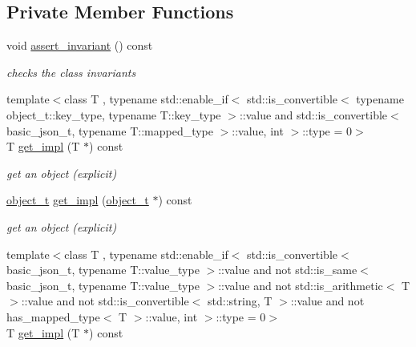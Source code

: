 \subsection*{Private Member Functions}
\begin{DoxyCompactItemize}
\item 
void \hyperlink{classnlohmann_1_1basic__json_a68ffa02e8ac1a14615bc767da40bc1c9}{assert\+\_\+invariant} () const 
\begin{DoxyCompactList}\small\item\em checks the class invariants \end{DoxyCompactList}\item 
{\footnotesize template$<$class T , typename std\+::enable\+\_\+if$<$                                                              std\+::is\+\_\+convertible$<$ typename object\+\_\+t\+::key\+\_\+type, typename T\+::key\+\_\+type $>$\+::value and                                                           std\+::is\+\_\+convertible$<$ basic\+\_\+json\+\_\+t, typename T\+::mapped\+\_\+type $>$\+::value, int $>$\+::type  = 0$>$ }\\T \hyperlink{classnlohmann_1_1basic__json_a87cb2949cc4e33885debfaa68780ec9b}{get\+\_\+impl} (T $\ast$) const 
\begin{DoxyCompactList}\small\item\em get an object (explicit) \end{DoxyCompactList}\item 
\hyperlink{classnlohmann_1_1basic__json_a0ac9894c9de8dc551cf2e5f1c605537f}{object\+\_\+t} \hyperlink{classnlohmann_1_1basic__json_a953389fde24cbb247d5e64b53351595f}{get\+\_\+impl} (\hyperlink{classnlohmann_1_1basic__json_a0ac9894c9de8dc551cf2e5f1c605537f}{object\+\_\+t} $\ast$) const 
\begin{DoxyCompactList}\small\item\em get an object (explicit) \end{DoxyCompactList}\item 
{\footnotesize template$<$class T , typename std\+::enable\+\_\+if$<$                                                              std\+::is\+\_\+convertible$<$ basic\+\_\+json\+\_\+t, typename T\+::value\+\_\+type $>$\+::value and                                                           not std\+::is\+\_\+same$<$ basic\+\_\+json\+\_\+t, typename T\+::value\+\_\+type $>$\+::value and                                                           not std\+::is\+\_\+arithmetic$<$ T $>$\+::value and                                                           not std\+::is\+\_\+convertible$<$ std\+::string, T $>$\+::value and                                                           not has\+\_\+mapped\+\_\+type$<$ T $>$\+::value, int $>$\+::type  = 0$>$ }\\T \hyperlink{classnlohmann_1_1basic__json_a87cb2949cc4e33885debfaa68780ec9b}{get\+\_\+impl} (T $\ast$) const 

\end{DoxyCompactItemize}

